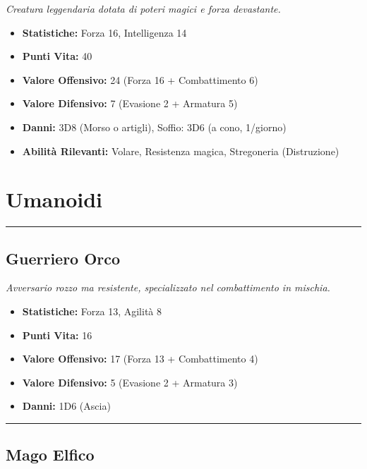 \documentclass[../manuale_main.tex]{subfiles}
\begin{document}
\textit{Creatura leggendaria dotata di poteri magici e forza devastante.}
\begin{itemize}
\item \textbf{Statistiche:} Forza 16, Intelligenza 14
\item \textbf{Punti Vita:} 40
\item \textbf{Valore Offensivo:} 24 (Forza 16 + Combattimento 6)
\item \textbf{Valore Difensivo:} 7 (Evasione 2 + Armatura 5)
\item \textbf{Danni:} 3D8 (Morso o artigli), Soffio: 3D6 (a cono, 1/giorno)
\item \textbf{Abilità Rilevanti:} Volare, Resistenza magica, Stregoneria (Distruzione)
\end{itemize}


\clearpage
\section*{Umanoidi}
\vspace{0.2cm}
\noindent
\begin{center}
\rule{\textwidth}{0.4pt} 
\end{center}
\vspace{0.2cm}

\subsection*{Guerriero Orco}
\textit{Avversario rozzo ma resistente, specializzato nel combattimento in mischia.}
\begin{itemize}
\item \textbf{Statistiche:} Forza 13, Agilità 8
\item \textbf{Punti Vita:} 16
\item \textbf{Valore Offensivo:} 17 (Forza 13 + Combattimento 4)
\item \textbf{Valore Difensivo:} 5 (Evasione 2 + Armatura 3)
\item \textbf{Danni:} 1D6 (Ascia)
\end{itemize}
\vspace{0.2cm}
\noindent
\begin{center}
\rule{\textwidth}{0.4pt} 
\end{center}
\vspace{0.2cm}
\subsection*{Mago Elfico}
\end{document}
